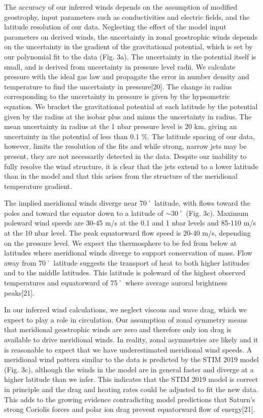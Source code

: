 The accuracy of our inferred winds depends on the assumption of modified geostrophy, input parameters such as conductivities and electric fields, and the latitude resolution of our data. Neglecting the effect of the model input parameters on derived winds, the uncertainty in zonal geostrophic winds depends on the uncertainty in the gradient of the gravitational potential, which is set by our polynomial fit to the data (Fig. 3a). The uncertainty in the potential itself is small, and is derived from uncertainty in pressure level radii. We calculate pressure with the ideal gas law and propagate the error in number density and temperature to find the uncertainty in pressure[20]. The change in radius corresponding to the uncertainty in pressure is given by the hypsometric equation. We bracket the gravitational potential at each latitude by the potential given by the radius at the isobar plus and minus the uncertainty in radius. The mean uncertainty in radius at the 1 nbar pressure level is 20 km, giving an uncertainty in the potential of less than 0.1 \%. The latitude spacing of our data, however, limits the resolution of the fits and while strong, narrow jets may be present, they are not necessarily detected in the data. Despite our inability to fully resolve the wind structure, it is clear that the jets extend to a lower latitude than in the model and that this arises from the structure of the meridional temperature gradient.

The implied meridional winds diverge near 70˚ latitude, with flows toward the poles and toward the equator down to a latitude of $\sim$30˚ (Fig. 3c). Maximum poleward wind speeds are 30-45 m/s at the 0.1 and 1 nbar levels and 85-110 m/s at the 10 nbar level. The peak equatorward flow speed is 20-40 m/s, depending on the pressure level. We expect the thermosphere to be fed from below at latitudes where meridional winds diverge to support conservation of mass. Flow away from 70˚ latitude suggests the transport of heat to both higher latitudes and to the middle latitudes. This latitude is poleward of the highest observed temperatures and equatorward of 75˚ where average auroral brightness peaks[21].

 In our inferred wind calculations, we neglect viscous and wave drag, which we expect to play a role in circulation. Our assumption of zonal symmetry means that meridional geostrophic winds are zero and therefore only ion drag is available to drive meridional winds. In reality, zonal asymmetries are likely and it is reasonable to expect that we have underestimated meridional wind speeds. A meridional wind pattern similar to the data is predicted by the STIM 2019 model (Fig. 3c), although the winds in the model are in general faster and diverge at a higher latitude than we infer. This indicates that the STIM 2019 model is correct in principle and the drag and heating rates could be adjusted to fit the new data. This adds to the growing evidence contradicting model predictions that Saturn’s strong Coriolis forces and polar ion drag prevent equatorward flow of energy[21].
 

